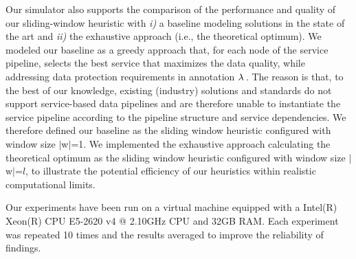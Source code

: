     Our simulator also supports the comparison of the performance and quality of our sliding-window heuristic with \emph{i)} a baseline modeling solutions in the state of the art and \emph{ii)} the exhaustive approach (i.e., the theoretical optimum). We modeled our baseline as a greedy approach that, for each node of the service pipeline, selects the best service that maximizes the data quality, while addressing data protection requirements in annotation $\lambda\,$. The reason is that, to the best of our knowledge, existing (industry) solutions and standards do not support service-based data pipelines and are therefore unable to instantiate the service pipeline according to the pipeline structure and service dependencies. We therefore defined our baseline as the sliding window heuristic configured with window size $|$w$|$=1.
    We implemented the exhaustive approach calculating the theoretical optimum as the sliding window heuristic configured with window size $|$w$|$=$l$, to illustrate the potential efficiency of our heuristics within realistic computational limits.



    Our experiments have been run on a virtual machine equipped with a Intel(R) Xeon(R) CPU E5-2620 v4 @ 2.10GHz CPU and 32GB RAM. Each experiment was repeated 10 times and the results averaged to improve the reliability of findings.

